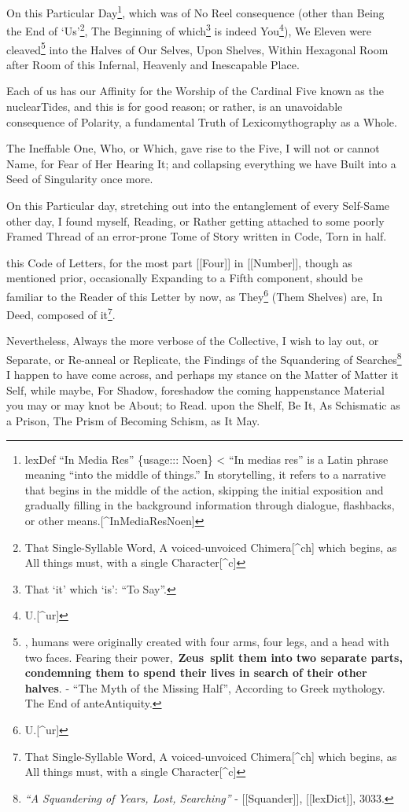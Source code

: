 \documentclass[
]{article}
\begin{document}
On this Particular Day\footnote{lexDef ``In Media Res'' \{usage:::
  Noen\} \textless{} ``In medias res'' is a Latin phrase meaning ``into
  the middle of things.'' In storytelling, it refers to a narrative that
  begins in the middle of the action, skipping the initial exposition
  and gradually filling in the background information through dialogue,
  flashbacks, or other means.{[}\^{}InMediaResNoen{]}}, which was of No
Reel consequence (other than Being the End of `Us'\footnote{That
  Single-Syllable Word, A voiced-unvoiced Chimera{[}\^{}ch{]} which
  begins, as All things must, with a single Character{[}\^{}c{]}}, The
Beginning of which\footnote{That `it' which `is': ``To Say''.} is indeed
You\footnote{U.{[}\^{}ur{]}}), We Eleven were cleaved\footnote{, humans
  were originally created with four arms, four legs, and a head with two
  faces. Fearing their power,~\textbf{Zeus~split them into two separate
  parts, condemning them to spend their lives in search of their other
  halves}. - ``The Myth of the Missing Half'', According to Greek
  mythology. The End of anteAntiquity.} into the Halves of Our Selves,
Upon Shelves, Within Hexagonal Room after Room of this Infernal,
Heavenly and Inescapable Place.

Each of us has our Affinity for the Worship of the Cardinal Five known
as the nuclearTides, and this is for good reason; or rather, is an
unavoidable consequence of Polarity, a fundamental Truth of
Lexicomythography as a Whole.

The Ineffable One, Who, or Which, gave rise to the Five, I will not or
cannot Name, for Fear of Her Hearing It; and collapsing everything we
have Built into a Seed of Singularity once more.

On this Particular day, stretching out into the entanglement of every
Self-Same other day, I found myself, Reading, or Rather getting attached
to some poorly Framed Thread of an error-prone Tome of Story written in
Code, Torn in half.

this Code of Letters, for the most part {[}{[}Four{]}{]} in
{[}{[}Number{]}{]}, though as mentioned prior, occasionally Expanding to
a Fifth component, should be familiar to the Reader of this Letter by
now, as They\footnote{U.{[}\^{}ur{]}} (Them Shelves) are, In Deed,
composed of it\footnote{That Single-Syllable Word, A voiced-unvoiced
  Chimera{[}\^{}ch{]} which begins, as All things must, with a single
  Character{[}\^{}c{]}}.

Nevertheless, Always the more verbose of the Collective, I wish to lay
out, or Separate, or Re-anneal or Replicate, the Findings of the
Squandering of Searches\footnote{\emph{``A Squandering of Years, Lost,
  Searching''} - {[}{[}Squander{]}{]}, {[}{[}lexDict{]}{]}, 3033.} I
happen to have come across, and perhaps my stance on the Matter of
Matter it Self, while maybe, For Shadow, foreshadow the coming
happenstance Material you may or may knot be About; to Read. upon the
Shelf, Be It, As Schismatic as a Prison, The Prism of Becoming Schism,
as It May.
\end{document}
